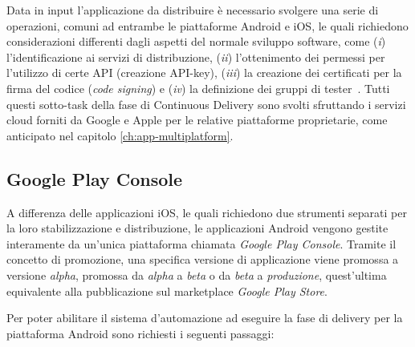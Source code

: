 Data in input l'applicazione da distribuire è necessario svolgere una serie di operazioni, 
comuni ad entrambe le piattaforme Android e iOS, 
le quali richiedono considerazioni differenti dagli aspetti del normale sviluppo software, 
come (\textit{i}) l'identificazione ai servizi di distribuzione, 
(\textit{ii}) l'ottenimento dei permessi per l'utilizzo di certe API (creazione API-key), 
(\textit{iii}) la creazione dei certificati per la firma del codice (\textit{code signing}) e (\textit{iv}) la definizione dei gruppi di tester~\cite{mednieks2011programming}. 
Tutti questi sotto-task della fase di Continuous Delivery sono svolti sfruttando i servizi cloud forniti da Google e Apple per le relative piattaforme proprietarie, 
come anticipato nel capitolo \ref{ch:app-multiplatform}.

\subsection{Google Play Console}
A differenza delle applicazioni iOS, 
le quali richiedono due strumenti separati per la loro stabilizzazione e distribuzione, 
le applicazioni Android vengono gestite interamente da un'unica piattaforma chiamata \textit{Google Play Console}. 
Tramite il concetto di promozione,
una specifica versione di applicazione viene promossa a versione \textit{alpha}, 
promossa da \textit{alpha} a \textit{beta} o da \textit{beta} a \textit{produzione}, 
quest'ultima equivalente alla pubblicazione sul marketplace \textit{Google Play Store}.

Per poter abilitare il sistema d'automazione ad eseguire la fase di delivery per la piattaforma Android sono richiesti i seguenti passaggi:

